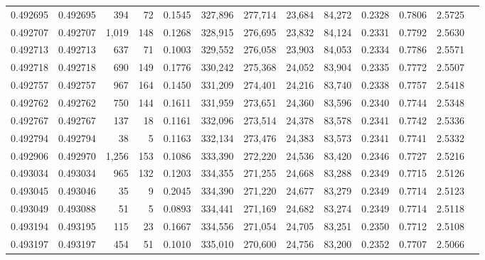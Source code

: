 \begin{tabular}{rrrrrrrrrrrrr}
0.492695 & 0.492695 &   394 &    72 &                                     0.1545 & 327,896 & 277,714 &  23,684 &  84,272 & 0.2328 & 0.7806 & 2.5725 \\
0.492707 & 0.492707 & 1,019 &   148 &                                     0.1268 & 328,915 & 276,695 &  23,832 &  84,124 & 0.2331 & 0.7792 & 2.5630 \\
0.492713 & 0.492713 &   637 &    71 &                                     0.1003 & 329,552 & 276,058 &  23,903 &  84,053 & 0.2334 & 0.7786 & 2.5571 \\
0.492718 & 0.492718 &   690 &   149 &                                     0.1776 & 330,242 & 275,368 &  24,052 &  83,904 & 0.2335 & 0.7772 & 2.5507 \\
0.492757 & 0.492757 &   967 &   164 &                                     0.1450 & 331,209 & 274,401 &  24,216 &  83,740 & 0.2338 & 0.7757 & 2.5418 \\
0.492762 & 0.492762 &   750 &   144 &                                     0.1611 & 331,959 & 273,651 &  24,360 &  83,596 & 0.2340 & 0.7744 & 2.5348 \\
0.492767 & 0.492767 &   137 &    18 &                                     0.1161 & 332,096 & 273,514 &  24,378 &  83,578 & 0.2341 & 0.7742 & 2.5336 \\
0.492794 & 0.492794 &    38 &     5 &                                     0.1163 & 332,134 & 273,476 &  24,383 &  83,573 & 0.2341 & 0.7741 & 2.5332 \\
0.492906 & 0.492970 & 1,256 &   153 &                                     0.1086 & 333,390 & 272,220 &  24,536 &  83,420 & 0.2346 & 0.7727 & 2.5216 \\
0.493034 & 0.493034 &   965 &   132 &                                     0.1203 & 334,355 & 271,255 &  24,668 &  83,288 & 0.2349 & 0.7715 & 2.5126 \\
0.493045 & 0.493046 &    35 &     9 &                                     0.2045 & 334,390 & 271,220 &  24,677 &  83,279 & 0.2349 & 0.7714 & 2.5123 \\
0.493049 & 0.493088 &    51 &     5 &                                     0.0893 & 334,441 & 271,169 &  24,682 &  83,274 & 0.2349 & 0.7714 & 2.5118 \\
0.493194 & 0.493195 &   115 &    23 &                                     0.1667 & 334,556 & 271,054 &  24,705 &  83,251 & 0.2350 & 0.7712 & 2.5108 \\
0.493197 & 0.493197 &   454 &    51 &                                     0.1010 & 335,010 & 270,600 &  24,756 &  83,200 & 0.2352 & 0.7707 & 2.5066 \\

\end{tabular}
